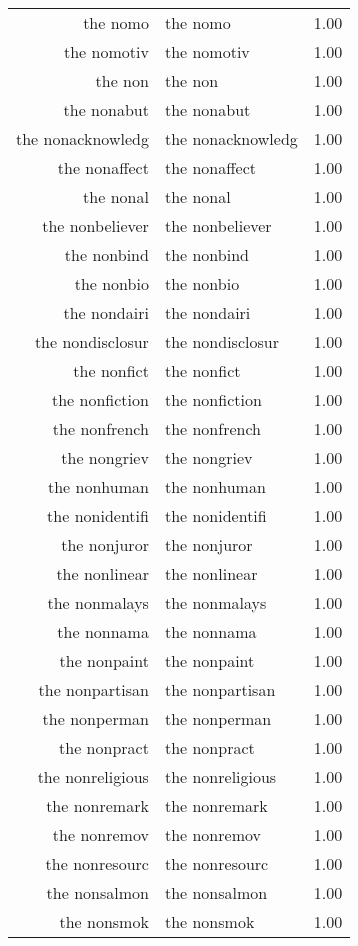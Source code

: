\begin{table}[ht]
\begin{tabular}{rlr}
  the nomo & the nomo & 1.00 \\ 
  the nomotiv & the nomotiv & 1.00 \\ 
  the non & the non & 1.00 \\ 
  the nonabut & the nonabut & 1.00 \\ 
  the nonacknowledg & the nonacknowledg & 1.00 \\ 
  the nonaffect & the nonaffect & 1.00 \\ 
  the nonal & the nonal & 1.00 \\ 
  the nonbeliever & the nonbeliever & 1.00 \\ 
  the nonbind & the nonbind & 1.00 \\ 
  the nonbio & the nonbio & 1.00 \\ 
  the nondairi & the nondairi & 1.00 \\ 
  the nondisclosur & the nondisclosur & 1.00 \\ 
  the nonfict & the nonfict & 1.00 \\ 
  the nonfiction & the nonfiction & 1.00 \\ 
  the nonfrench & the nonfrench & 1.00 \\ 
  the nongriev & the nongriev & 1.00 \\ 
  the nonhuman & the nonhuman & 1.00 \\ 
  the nonidentifi & the nonidentifi & 1.00 \\ 
  the nonjuror & the nonjuror & 1.00 \\ 
  the nonlinear & the nonlinear & 1.00 \\ 
  the nonmalays & the nonmalays & 1.00 \\ 
  the nonnama & the nonnama & 1.00 \\ 
  the nonpaint & the nonpaint & 1.00 \\ 
  the nonpartisan & the nonpartisan & 1.00 \\ 
  the nonperman & the nonperman & 1.00 \\ 
  the nonpract & the nonpract & 1.00 \\ 
  the nonreligious & the nonreligious & 1.00 \\ 
  the nonremark & the nonremark & 1.00 \\ 
  the nonremov & the nonremov & 1.00 \\ 
  the nonresourc & the nonresourc & 1.00 \\ 
  the nonsalmon & the nonsalmon & 1.00 \\ 
  the nonsmok & the nonsmok & 1.00 \\ 

\end{tabular}
\end{table}
